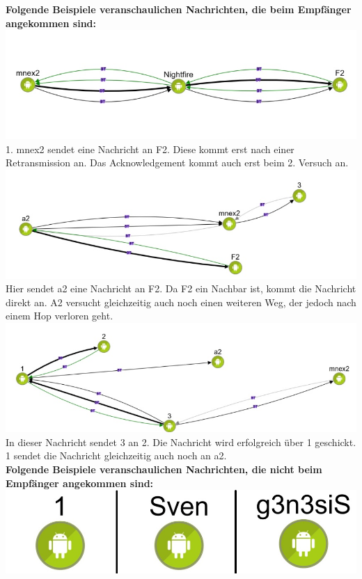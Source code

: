 \textbf{Folgende Beispiele veranschaulichen Nachrichten, die beim
Empfänger angekommen sind:}\\
\includegraphics[width=1.0\textwidth]{belege/grosstests/Bilder/Grosstest2/Test1Erfolg2.jpg}\\
1. mnex2 sendet eine Nachricht an F2. Diese kommt erst nach einer
Retransmission an. Das Acknowledgement kommt auch erst beim 2. Versuch
an.\\
\includegraphics[width=1.0\textwidth]{belege/grosstests/Bilder/Grosstest2/Test1Erfolg1.jpg}\\
Hier sendet a2 eine Nachricht an F2. Da F2 ein Nachbar ist, kommt die
Nachricht direkt an. A2 versucht gleichzeitig auch noch einen weiteren
Weg, der jedoch nach einem Hop verloren geht.\\
\includegraphics[width=1.0\textwidth]{belege/grosstests/Bilder/Grosstest2/Test1Erfolg3.jpg}\\
In dieser Nachricht sendet 3 an 2. Die Nachricht wird erfolgreich über 1
geschickt. 1 sendet die Nachricht gleichzeitig auch noch an a2.
\\
\textbf{Folgende Beispiele veranschaulichen Nachrichten, die nicht beim
Empfänger angekommen sind:}\\
\includegraphics[width=1.0\textwidth]{belege/grosstests/Bilder/Grosstest2/Test1Misserfolg2.jpg}\\
